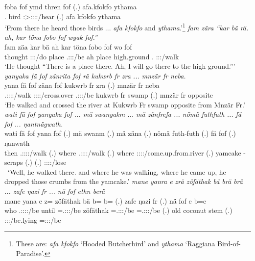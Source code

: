 \begin{exe}
	\gll foba fof ymd thren fof (.) {afa.kfokfo} ythama\\ 
	\Dist.{\Abl} {\Emph} bird \Stsg:\Sbj>\Stpl:\Obj:\Irr:\Pfv:\Venit/hear {\Emph} (.) {afa kfokfo} ythama\\
	\trans `From there he heard those birds ... \emph{afa kfokfo} and \emph{ythama}.'\footnote{These are: \emph{afa kfokfo} `Hooded Butcherbird' and \emph{ythama} `Raggiana Bird-of-Paradise'.}
	\emph{fam zära ``kar bä rä. ah, kar töna fobo fof wyak fof.''}\\
	\gll fam zäa kar bä  ah kar töna fobo fof wo fof\\ 
	thought \Sg:\Sbj:\Pst:\Pfv/do place \Med{} \Tsg.\F:\Sbj:\Nonpast:\Ipfv/be ah place high.ground \Dist.{\All} {\Emph} \Fsg:\Sbj:\Nonpast:\Ipfv/walk \Emph\\
	\trans `He thought ``There is a place there. Ah, I will go there to the high ground.'''
	\emph{yanyaka fä fof zänrita fof rä kukwrb fr zra ... mnzär fr neba.}\\
	\gll yana fä fof zäna fof  {kukwrb fr} zra (.) {mnzär fr} neba\\ 
	\Tsg.\Masc:\Sbj:\Pst:\Ipfv:\Venit/walk {\Dist} {\Emph} \Sg:\Sbj:\Pst:\Pfv:\Venit/cross.over {\Emph} \Tsg.\F:\Sbj:\Nonpast:\Ipfv/be {kukwrb fr} swamp (.) {mnzär fr} opposite\\
	\trans `He walked and crossed the river at Kukwrb Fr swamp opposite from Mnzär Fr.'
	\emph{wati fä fof yanyaka fof ... mä swanyakm ... mä zänfrefa ... nömä futhfuth ... fä fof ... ŋantnägwath.}\\
	\gll wati fä fof yana fof (.) mä swanm (.) mä zäna (.) nömä futh-futh (.) fä fof (.) ŋanwath\\ 
	then {\Dist} {\Emph} \Tsg.\Masc:\Sbj:\Pst:\Ipfv:\Venit/walk {\Emph} (.) where \Tsg.\Masc:\Sbj:\Pst:\Dur:\Venit/walk (.) where \Sg:\Sbj:\Pst:\Pfv:\Venit/come.up.from.river (.) yamcake \Redup-scraps (.) {\Dist} {\Emph} (.) \Stpl:\Sbj:\Pst:\Ipfv:\Venit/lose\\\
	\trans `Well, he walked there. and where he was walking, where he came up, he dropped those crumbs from the yamcake.'
\exi{127} 
	\emph{mane yanra e zrä zöfäthak bä brä brä ... zafe ŋazi fr ... nä fof ethn berä}\\
	\gll mane yan\stem{r}a e z= zöfäthak bä b=\stem{rä} b=\stem{rä} (.) zafe ŋazi fr (.) nä fof e b=e\\ 
	who \Tsg.\Masc:\Sbj:\Pst:\Ipfv:\Venit/be until \Prox=\Tsg.\F:\Sbj:\Nonpast:\Ipfv/be zöfäthak \Med{} \Med=\Tsg.\F:\Sbj:\Nonpast:\Ipfv/be \Med=\Tsg.\F:\Sbj:\Nonpast:\Ipfv/be (.) old coconut stem (.) {\Indf} {\Emph} \Stpl:\Sbj:\Nonpast:\Stat/be.lying \Med=\Stpl:\Sbj:\Nonpast:\Ipfv/be\\

\end{exe}
